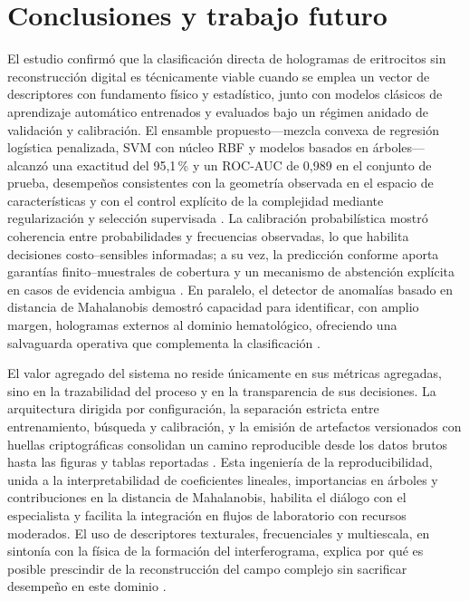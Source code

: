 \chapter{Conclusiones y trabajo futuro}\label{chap:conclusiones}

El estudio confirmó que la clasificación directa de hologramas de eritrocitos sin reconstrucción digital es técnicamente viable cuando se emplea un vector de descriptores con fundamento físico y estadístico, junto con modelos clásicos de aprendizaje automático entrenados y evaluados bajo un régimen anidado de validación y calibración. El ensamble propuesto—mezcla convexa de regresión logística penalizada, SVM con núcleo RBF y modelos basados en árboles—alcanzó una exactitud del 95,1\,\% y un ROC-AUC de 0,989 en el conjunto de prueba, desempeños consistentes con la geometría observada en el espacio de características y con el control explícito de la complejidad mediante regularización y selección supervisada \cite{Pedregosa2011,Friedman2001,Tsamardinos2022,Vabalas2019}. La calibración probabilística mostró coherencia entre probabilidades y frecuencias observadas, lo que habilita decisiones costo–sensibles informadas; a su vez, la predicción conforme aporta garantías finito–muestrales de cobertura y un mecanismo de abstención explícita en casos de evidencia ambigua \cite{Montero2024}. En paralelo, el detector de anomalías basado en distancia de Mahalanobis demostró capacidad para identificar, con amplio margen, hologramas externos al dominio hematológico, ofreciendo una salvaguarda operativa que complementa la clasificación \cite{Mahalanobis1936,Rousseeuw2019}.

El valor agregado del sistema no reside únicamente en sus métricas agregadas, sino en la trazabilidad del proceso y en la transparencia de sus decisiones. La arquitectura dirigida por configuración, la separación estricta entre entrenamiento, búsqueda y calibración, y la emisión de artefactos versionados con huellas criptográficas consolidan un camino reproducible desde los datos brutos hasta las figuras y tablas reportadas \cite{Tsamardinos2022,EAFIT2018}. Esta ingeniería de la reproducibilidad, unida a la interpretabilidad de coeficientes lineales, importancias en árboles y contribuciones en la distancia de Mahalanobis, habilita el diálogo con el especialista y facilita la integración en flujos de laboratorio con recursos moderados. El uso de descriptores texturales, frecuenciales y multiescala, en sintonía con la física de la formación del interferograma, explica por qué es posible prescindir de la reconstrucción del campo complejo sin sacrificar desempeño en este dominio \cite{Greenbaum2014,Amann2019,OConnor2020}.

